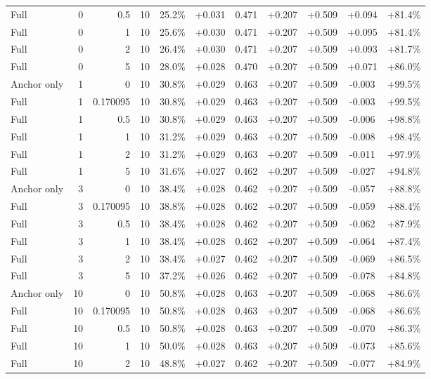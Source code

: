 \begin{table}[htbp]
\begin{tabular}{lrrrccccccc}
Full & 0 & 0.5 & 10 & 25.2\% & +0.031 & 0.471 & +0.207 & +0.509 & +0.094 & +81.4\% \\
Full & 0 & 1 & 10 & 25.6\% & +0.030 & 0.471 & +0.207 & +0.509 & +0.095 & +81.4\% \\
Full & 0 & 2 & 10 & 26.4\% & +0.030 & 0.471 & +0.207 & +0.509 & +0.093 & +81.7\% \\
Full & 0 & 5 & 10 & 28.0\% & +0.028 & 0.470 & +0.207 & +0.509 & +0.071 & +86.0\% \\
Anchor only & 1 & 0 & 10 & 30.8\% & +0.029 & 0.463 & +0.207 & +0.509 & -0.003 & +99.5\% \\
Full & 1 & 0.170095 & 10 & 30.8\% & +0.029 & 0.463 & +0.207 & +0.509 & -0.003 & +99.5\% \\
Full & 1 & 0.5 & 10 & 30.8\% & +0.029 & 0.463 & +0.207 & +0.509 & -0.006 & +98.8\% \\
Full & 1 & 1 & 10 & 31.2\% & +0.029 & 0.463 & +0.207 & +0.509 & -0.008 & +98.4\% \\
Full & 1 & 2 & 10 & 31.2\% & +0.029 & 0.463 & +0.207 & +0.509 & -0.011 & +97.9\% \\
Full & 1 & 5 & 10 & 31.6\% & +0.027 & 0.462 & +0.207 & +0.509 & -0.027 & +94.8\% \\
Anchor only & 3 & 0 & 10 & 38.4\% & +0.028 & 0.462 & +0.207 & +0.509 & -0.057 & +88.8\% \\
Full & 3 & 0.170095 & 10 & 38.8\% & +0.028 & 0.462 & +0.207 & +0.509 & -0.059 & +88.4\% \\
Full & 3 & 0.5 & 10 & 38.4\% & +0.028 & 0.462 & +0.207 & +0.509 & -0.062 & +87.9\% \\
Full & 3 & 1 & 10 & 38.4\% & +0.028 & 0.462 & +0.207 & +0.509 & -0.064 & +87.4\% \\
Full & 3 & 2 & 10 & 38.4\% & +0.027 & 0.462 & +0.207 & +0.509 & -0.069 & +86.5\% \\
Full & 3 & 5 & 10 & 37.2\% & +0.026 & 0.462 & +0.207 & +0.509 & -0.078 & +84.8\% \\
Anchor only & 10 & 0 & 10 & 50.8\% & +0.028 & 0.463 & +0.207 & +0.509 & -0.068 & +86.6\% \\
Full & 10 & 0.170095 & 10 & 50.8\% & +0.028 & 0.463 & +0.207 & +0.509 & -0.068 & +86.6\% \\
Full & 10 & 0.5 & 10 & 50.8\% & +0.028 & 0.463 & +0.207 & +0.509 & -0.070 & +86.3\% \\
Full & 10 & 1 & 10 & 50.0\% & +0.028 & 0.463 & +0.207 & +0.509 & -0.073 & +85.6\% \\
Full & 10 & 2 & 10 & 48.8\% & +0.027 & 0.462 & +0.207 & +0.509 & -0.077 & +84.9\% \\

\end{tabular}
\end{table}
